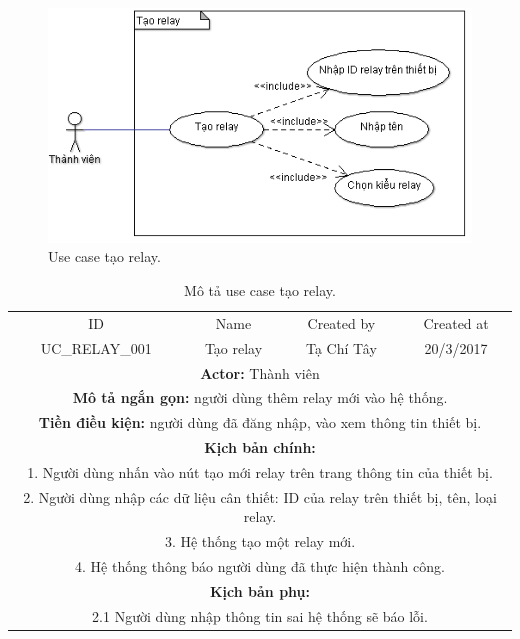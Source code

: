 \documentclass[a4paper,12pt,oneside]{article}
\begin{document}
\begin{figure}[htp]
\centering
\includegraphics[scale=1]{hinh/addrelay.png}
\caption{Use case tạo relay.}
\end{figure}

\begin{table}[!htp]
\centering
\begin{tabularx}{\linewidth}{ |c||c|c|c| }
\hline
ID & Name & Created by & Created at\\
UC\_RELAY\_001 & Tạo relay & Tạ Chí Tây & 20/3/2017\\
\hline
\multicolumn{4}{|X|}{\textbf{Actor:} Thành viên }\\
\hline
\multicolumn{4}{|X|}{\textbf{Mô tả ngắn gọn:} người dùng thêm relay mới vào hệ thống. }\\
\hline
\multicolumn{4}{|X|}{\textbf{Tiền điều kiện:} người dùng đã đăng nhập, vào xem thông tin thiết bị.}\\
\hline
\multicolumn{4}{|X|}{\textbf{Kịch bản chính:}}\\
\multicolumn{4}{|X|}{1.	Người dùng nhấn vào nút tạo mới relay trên trang thông tin của thiết bị.}\\
\multicolumn{4}{|X|}{ 
2.	Người dùng nhập các dữ liệu cân thiết: ID của relay trên thiết bị, tên, loại relay.}\\
\multicolumn{4}{|X|}{
3.	Hệ thống tạo một relay mới.}\\

\multicolumn{4}{|X|}{4. Hệ thống thông báo người dùng đã thực hiện thành công.}\\
\hline
\multicolumn{4}{|X|}{\textbf{Kịch bản phụ:}}\\
\multicolumn{4}{|X|}{2.1    Người dùng nhập thông tin sai hệ thống sẽ báo lỗi.}\\
\hline

\end{tabularx}
\caption{Mô tả use case tạo relay.}
\end{table}
\end{document}
